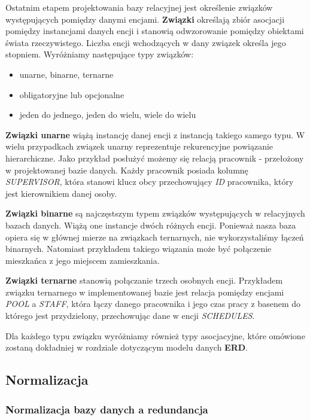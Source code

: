 \documentclass[a4paper]{article}
\begin{document}
Ostatnim etapem projektowania bazy relacyjnej jest określenie związków występujących pomiędzy danymi encjami. \textbf{Związki} określają zbiór asocjacji pomiędzy instancjami danych encji i stanowią odwzorowanie pomiędzy obiektami świata rzeczywistego. Liczba encji wchodzących w dany związek określa jego stopniem. Wyróżniamy następujące typy związków:
\begin{itemize}
    \item unarne, binarne, ternarne
    \item obligatoryjne lub opcjonalne
    \item jeden do jednego, jeden do wielu, wiele do wielu
\end{itemize}

\textbf{Związki unarne} wiążą instancję danej encji z instancją takiego samego typu. W wielu przypadkach związek unarny reprezentuje rekurencyjne powiązanie hierarchiczne. Jako przykład posłużyć możemy się relacją pracownik - przełożony w projektowanej bazie danych. Każdy pracownik posiada kolumnę \textit{SUPERVISOR}, która stanowi klucz obcy przechowujący \textit{ID} pracownika, który jest kierownikiem danej osoby.

\textbf{Związki binarne} są najczęstszym typem związków występujących w relacyjnych bazach danych. Wiążą one instancje dwóch różnych encji. Ponieważ nasza baza opiera się w głównej mierze na związkach ternarnych, nie wykorzystaliśmy łączeń binarnych. Natomiast przykładem takiego wiązania może być połączenie mieszkańca z jego miejscem zamieszkania.

\textbf{Związki ternarne} stanowią połączanie trzech osobnych encji. Przykładem związku ternarnego w implementowanej bazie jest relacja pomiędzy encjami \textit{POOL} a  \textit{STAFF}, która łączy danego pracownika i jego czas pracy z basenem do którego jest przydzielony, przechowując dane w encji \textit{SCHEDULES}.

Dla każdego typu związku wyróżniamy również typy asocjacyjne, które omówione zostaną dokładniej w rozdziale dotyczącym modelu danych \textbf{ERD}.

\newpage

\subsection{Normalizacja} \label{Redundancja}

\subsubsection{Normalizacja bazy danych a redundancja}
\end{document}
